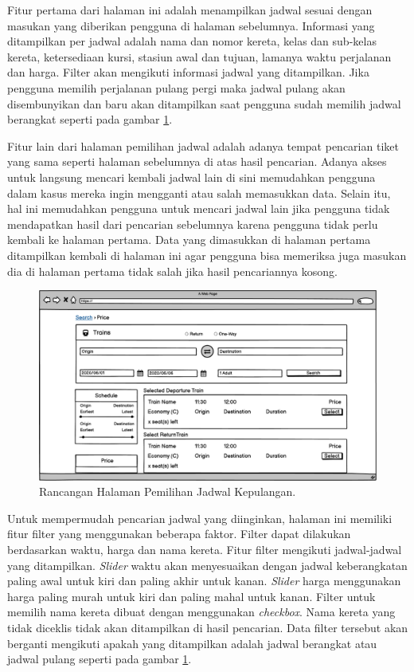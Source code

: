 Fitur pertama dari halaman ini adalah menampilkan jadwal sesuai dengan masukan yang diberikan pengguna di halaman sebelumnya. Informasi yang ditampilkan per jadwal adalah nama dan nomor kereta, kelas dan sub-kelas kereta, ketersediaan kursi, stasiun awal dan tujuan, lamanya waktu perjalanan dan harga. Filter akan mengikuti informasi jadwal yang ditampilkan. Jika pengguna memilih perjalanan pulang pergi maka jadwal pulang akan disembunyikan dan baru akan ditampilkan saat pengguna sudah memilih jadwal berangkat seperti pada gambar \ref{img:rancanganjadwalpulang}.

Fitur lain dari halaman pemilihan jadwal adalah adanya tempat pencarian tiket yang sama seperti halaman sebelumnya di atas hasil pencarian. Adanya akses untuk langsung mencari kembali jadwal lain di sini memudahkan pengguna dalam kasus mereka ingin mengganti atau salah memasukkan data. Selain itu, hal ini memudahkan pengguna untuk mencari jadwal lain jika pengguna tidak mendapatkan hasil dari pencarian sebelumnya karena pengguna tidak perlu kembali ke halaman pertama. Data yang dimasukkan di halaman pertama ditampilkan kembali di halaman ini agar pengguna bisa memeriksa juga masukan dia di halaman pertama tidak salah jika hasil pencariannya kosong.

\begin{figure}[H]
\center
\includegraphics[width=\textwidth,height=\textheight,keepaspectratio]{Gambar/Halaman Pemilihan Jadwal (Kepulangan).png}
\caption{Rancangan Halaman Pemilihan Jadwal Kepulangan.}
    \label{img:rancanganjadwalpulang}
\end{figure}

Untuk mempermudah pencarian jadwal yang diinginkan, halaman ini memiliki fitur filter yang menggunakan beberapa faktor. Filter dapat dilakukan berdasarkan waktu, harga dan nama kereta. Fitur filter mengikuti jadwal-jadwal yang ditampilkan. \textit{Slider} waktu akan menyesuaikan dengan jadwal keberangkatan paling awal untuk kiri dan paling akhir untuk kanan. \textit{Slider} harga menggunakan harga paling murah untuk kiri dan paling mahal untuk kanan. Filter untuk memilih nama kereta dibuat dengan menggunakan \textit{checkbox}. Nama kereta yang tidak diceklis tidak akan ditampilkan di hasil pencarian. Data filter tersebut akan berganti mengikuti apakah yang ditampilkan adalah jadwal berangkat atau jadwal pulang seperti pada gambar \ref{img:rancanganjadwalpulang}.

